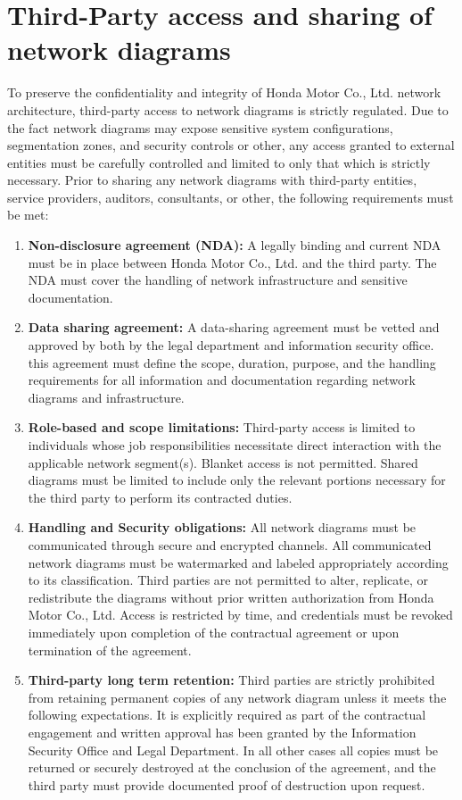 \section{Third-Party access and sharing of network diagrams}
To preserve the confidentiality and integrity of Honda Motor Co., Ltd. network architecture, third-party access to network diagrams is strictly regulated. Due to the fact network diagrams may expose sensitive system configurations, segmentation zones, and security controls or other, any access granted to external entities must be carefully controlled and limited to only that which is strictly necessary. Prior to sharing any network diagrams with third-party entities, service providers, auditors, consultants, or other, the following requirements must be met:
\begin{enumerate}
    \item \textbf{Non-disclosure agreement (NDA):}
    A legally binding and current NDA must be in place between Honda Motor Co., Ltd. and the third party. The NDA must cover the handling of network infrastructure and sensitive documentation.
    \item \textbf{Data sharing agreement:}
    A data-sharing agreement must be vetted and approved by both by the legal department and information security office. this agreement must define the scope, duration, purpose, and the handling requirements for all information and documentation regarding network diagrams and infrastructure.
    \item \textbf{Role-based and scope limitations:}
    Third-party access is limited to individuals whose job responsibilities necessitate direct interaction with the applicable network segment(s). Blanket access is not permitted. Shared diagrams must be limited to include only the relevant portions necessary for the third party to perform its contracted duties.
    \item \textbf{Handling and Security obligations:}
    All network diagrams must be communicated through secure and encrypted channels. All communicated network diagrams must be watermarked and labeled appropriately according to its classification. Third parties are not permitted to alter, replicate, or redistribute the diagrams without prior written authorization from Honda Motor Co., Ltd. Access is restricted by time, and credentials must be revoked immediately upon completion of the contractual agreement or upon termination of the agreement.
    \item \textbf{Third-party long term retention:}
    Third parties are strictly prohibited from retaining permanent copies of any network diagram unless it meets the following expectations. It is explicitly required as part of the contractual engagement and written approval has been granted by the Information Security Office and Legal Department. In all other cases all copies must be returned or securely destroyed at the conclusion of the agreement, and the third party must provide documented proof of destruction upon request.

\end{enumerate}
